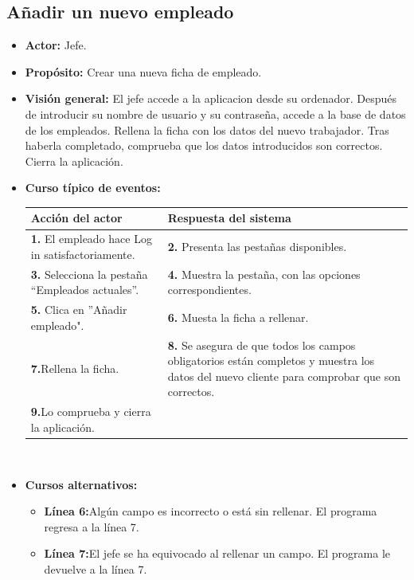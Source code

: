 \documentclass[spanish,a4paper,12pt]{report}	%
\begin{document}
	\subsection{Añadir un nuevo empleado}	
			\begin{itemize}
			\item \textbf{Actor:} Jefe.
			\item \textbf{Propósito: } Crear una nueva ficha de empleado.
			\item \textbf{Visión general:} El jefe accede a la aplicacion desde su ordenador. Después de introducir su nombre de usuario y su contraseña, accede a la base de datos de los empleados. Rellena la ficha con los datos del nuevo trabajador. Tras haberla completado, comprueba que los datos introducidos son correctos. Cierra la aplicación. 
			\item \textbf{Curso típico de eventos:} 	\\
				\begin{tabular}{|p{6cm}||p{6cm}|}
				\hline
				\textbf{Acción del actor} & \textbf{Respuesta del sistema} \\ \hline \hline
				\textbf{1.}   El empleado hace Log in satisfactoriamente. & \textbf{2.} Presenta las pestañas disponibles.\\ \hline
				\textbf{3.} Selecciona la pestaña “Empleados actuales”. & \textbf{4.} Muestra la pestaña, con las opciones correspondientes. \\ \hline
				\textbf{5.} Clica en ''Añadir empleado".	& \textbf{6.} Muesta la ficha a rellenar. \\ \hline
				\textbf{7.}Rellena la ficha. & \textbf{8.} Se asegura de que todos los campos obligatorios están completos y muestra los datos del nuevo cliente para comprobar que son correctos.\\ \hline
				\textbf{9.}Lo comprueba y cierra la aplicación. & \textbf{} \\ \hline
			\end{tabular}
			\\
			\item \textbf{Cursos alternativos:} 
			\begin{itemize}
			\item  \textbf{Línea 6:}Algún campo es incorrecto o está sin rellenar. El programa regresa a la línea 7.
			\item  \textbf{Línea 7:}El jefe se ha equivocado al rellenar un campo. El programa le devuelve a la línea 7.
			\end {itemize}
		\end{itemize}%
\end{document}
